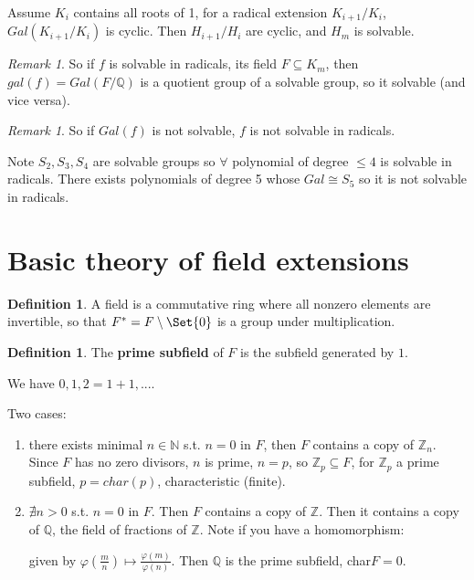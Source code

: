 \documentclass[9pt,reqno,twoside]{amsbook}
\theoremstyle{plain}
\numberwithin{section}{chapter}
\numberwithin{equation}{chapter}
\theoremstyle{definition}
\newtheorem{Def}[theorem]{Definition}
\theoremstyle{remark}
\newtheorem{rem}[theorem]{Remark}
\theoremstyle{plain}
\newcommand{\sub}{\subseteq}
\newcommand{\z}{\mathbb{Z}}
\newcommand{\n}{\mathbb{N}}
\newcommand{\Q}{\mathbb{Q}}
\newcommand{\fracc}{\frac}
\renewcommand{\leq}{\leqslant}
\renewcommand{\phi}{\varphi}
\begin{document}
Assume $K_i$ contains all roots of 1, for a radical extension $K_{i + 1}/K_i$, $Gal(K_{i + 1}/K_i)$ is cyclic. Then $H_{i + 1}/H_i$ are cyclic, and $H_m$ is solvable. 

\begin{rem}
So if $f$ is solvable in radicals, its field $F \sub K_m$, then $gal(f) = Gal(F/\Q)$ is a quotient group of a solvable group, so it solvable (and vice versa). 
\end{rem}


\begin{rem}
So if $Gal(f)$ is not solvable, $f$ is not solvable in radicals. 
\end{rem}

Note $S_2,S_3,S_4$ are solvable groups so $\forall$ polynomial of degree $\leq 4$ is solvable in radicals. There exists polynomials of degree 5 whose $Gal \cong S_5$ so it is not solvable in radicals. 

\section{Basic theory of field extensions}



\begin{Def}
A field is a commutative ring where all nonzero elements are invertible, so that $F^* = F\setminus \Set{0}$ is a group under multiplication. 
\end{Def}

\begin{Def}
The \textbf{prime subfield} of $F$ is the subfield generated by $1$. 


We have $0,1,2 = 1 + 1,...$. 
\end{Def}

Two cases:
\begin{enumerate}
\item there exists minimal $n \in \n$ s.t. $n = 0$ in $F$, then $F$ contains a copy of $\z_n$. Since $F$ has no zero divisors, $n$ is prime, $n = p$, so $\z_p \sub F$, for $\z_p$ a prime subfield, $p = char(p)$, characteristic (finite). 
\item $\nexists n > 0$ s.t. $n = 0$ in $F$. Then $F$ contains a copy of $\z$. Then it contains a copy of $\Q$, the field of fractions of $\z$. Note if you have a homomorphism:
\begin{center}
\end{center}
given by $\phi(\fracc{m}{n}) \mapsto \fracc{\phi(m)}{\phi(n)}$. Then $\Q$ is the prime subfield, char$F = 0$. 
\end{enumerate}
\end{document}
